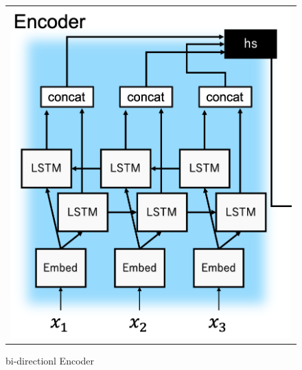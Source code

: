 \documentclass[a4paper,twocolumn]{jsarticle}
\begin{document}
\begin{figure}[htpb]
\begin{tabular}{c}
    \begin{minipage}{0.33\hsize}
      \centering
      \includegraphics[width=\linewidth]{image/twinRNN_encoder.png}
      \caption{bi-directionl Encoder}
      \label{fig:bi-directionl Seq2seq}
    \end{minipage}


\end{tabular}
\end{figure}
\end{document}

